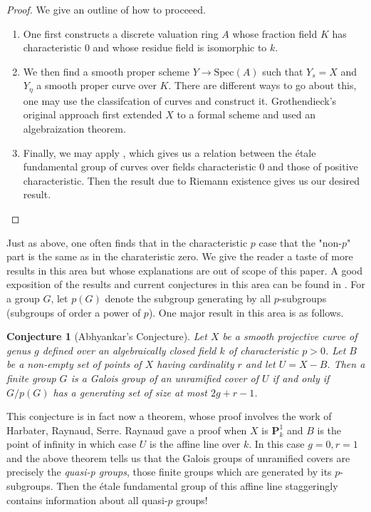 \documentclass{article}
\theoremstyle{definition}
\theoremstyle{remark}
\theoremstyle{plain}
\newtheorem{conjecture}[theorem]{Conjecture}
\begin{document}
\begin{proof} We give an outline of how to proceeed.
	\begin{enumerate}
		\item One first constructs a discrete valuation ring $A$ whose fraction field $K$ has characteristic 0 and whose residue field is isomorphic to $k$.
\item We then find a smooth proper scheme $Y \to \text{Spec}(A)$ such that $Y_{s} = X$ and $Y_{\eta}$ a smooth proper curve over $K$.
	There are different ways to go about this, one may use the classifcation of curves and construct it.
	Grothendieck's original approach first extended $X$ to a formal scheme and used an algebraization theorem.
\item Finally, we may apply , which gives us a relation between the \'etale fundamental group of curves over fields characteristic 0 and those of positive characteristic.
	Then the result  due to Riemann existence gives us our desired result. 
	\end{enumerate}
	
\end{proof}

Just as above, one often finds that in the characteristic $p$ case that the "non-$p$" part is the same as in the charateristic zero.
We give the reader a taste of more results in this area but whose explanations are out of scope of this paper.
A good exposition of the results and current conjectures in this area can be found in  \cite{abhyankar}.
For a group $G$, let $p(G)$ denote the subgroup generating by all $p$-subgroups (subgroups of order a power of $p$).
One major result in this area is as follows.

\begin{conjecture}[Abhyankar's Conjecture]
	Let $X$ be a smooth projective curve of genus $g$ defined over an algebraically closed field $k$ of characteristic $p > 0$.
	Let $B$ be a non-empty set of points of $X$ having cardinality $r$ and let $U = X - B$.
	Then a finite group $G$ is a Galois group of an unramified cover of $U$ if and only if $G/p(G)$ has a generating set of size at most $2g + r -1$.
\end{conjecture}

This conjecture is in fact now a theorem, whose proof involves the work of Harbater, Raynaud, Serre.
Raynaud gave a proof when $X$ is $\textbf{P}_k^1$ and $B$ is the point of infinity in which case $U$ is the affine line over $k$.
In this case $g = 0, r = 1$ and the above theorem tells us that the Galois groups of unramified covers are precisely the \textit{quasi-p groups}, those finite groups which are generated by its $p$-subgroups.
Then the \'etale fundamental group of this affine line staggeringly contains information about all quasi-$p$ groups!





\newpage


\end{document}

